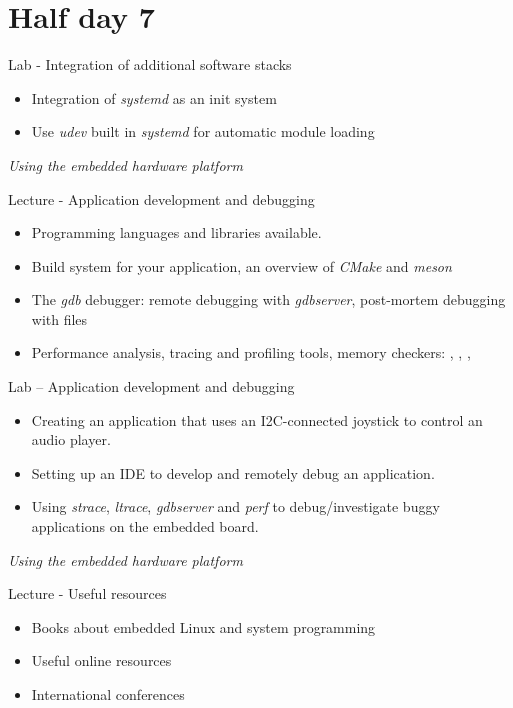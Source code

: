 \documentclass[a4paper,12pt,obeyspaces,spaces,hyphens]{article}
\begin{document}
\section{Half day 7}

\feagendaonecolumn
{Lab - Integration of additional software stacks}
{
  \begin{itemize}
  \item Integration of {\em systemd} as an init system
  \item Use {\em udev} built in {\em systemd} for automatic module
    loading
  \end{itemize}

  \vspace{0.5cm}
  {\em Using the embedded hardware platform}
}

\feagendatwocolumn
{Lecture - Application development and debugging}
{
  \begin{itemize}
  \item Programming languages and libraries available.
  \item Build system for your application, an overview of {\em CMake}
    and {\em meson}
  \item The {\em gdb} debugger: remote debugging with {\em gdbserver},
    post-mortem debugging with  files
  \item Performance analysis, tracing and profiling tools, memory
    checkers: , , ,
  \end{itemize}
}
{Lab – Application development and debugging}
{
  \begin{itemize}
  \item Creating an application that uses an I2C-connected joystick to
    control an audio player.
  \item Setting up an IDE to develop and remotely debug an
    application.
  \item Using {\em strace}, {\em ltrace}, {\em gdbserver} and {\em
      perf} to debug/investigate buggy applications on the embedded
    board.
  \end{itemize}

  \vspace{0.5cm}
  {\em Using the embedded hardware platform}
}

\feagendaonecolumn
{Lecture - Useful resources}
{
  \begin{itemize}
  \item Books about embedded Linux and system programming
  \item Useful online resources
  \item International conferences
  \end{itemize}
}
\end{document}
